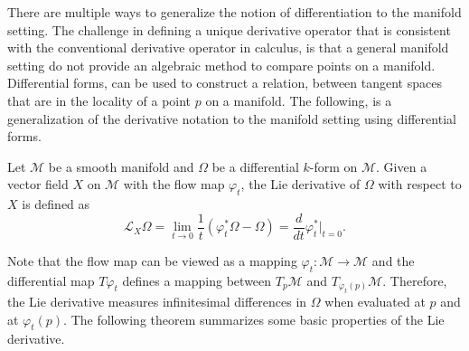 There are multiple ways to generalize the notion of differentiation to the manifold setting. The challenge in defining a unique derivative operator that is consistent with the conventional derivative operator in calculus, is that a general manifold setting do not provide an algebraic method to compare points on a manifold. Differential forms, can be used to construct a relation, between tangent spaces that are in the locality of a point $p$ on a manifold. The following, is a generalization of the derivative notation to the manifold setting using differential forms.
\begin{definition}
Let $\mathcal M$ be a smooth manifold and $\Omega$ be a differential $k$-form on $\mathcal M$. Given a vector field $X$ on $\mathcal M$ with the flow map $\varphi_t$, the Lie derivative of $\Omega$ with respect to $X$ is defined as
\begin{equation} \label{eq:2.10}
	\mathcal L_X \Omega = \lim_{t\to 0} \frac 1 t (\varphi^*_t \Omega - \Omega) = \frac {d}{dt} \varphi^*_t |_{t=0}.
\end{equation}
\end{definition}
Note that the flow map can be viewed as a mapping $\varphi_t:\mathcal M \to \mathcal M$ and the differential map $T \varphi _t$ defines a mapping between $T_p \mathcal M$ and $T_{ \varphi_t(p) } \mathcal M$. Therefore, the Lie derivative measures infinitesimal differences in $\Omega$ when evaluated at $p$ and at $\varphi_t(p)$. The following theorem summarizes some basic properties of the Lie derivative.

